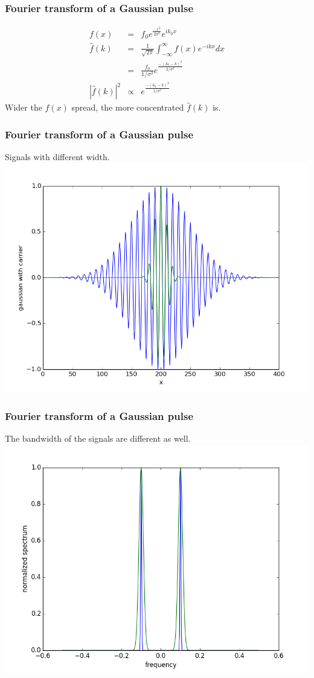 \documentclass{beamer}
\begin{document}
\begin{frame}
\frametitle{Fourier transform of a Gaussian pulse}
\begin{eqnarray}
f(x)&=&f_0e^{\frac{-x^2}{2\sigma^2}}e^{ik_0x} \nonumber \\
\hat{f}(k)&=&\frac{1}{\sqrt{2\pi}}\int_{-\infty}^{\infty}f(x)e^{-ikx}dx \nonumber \\
&=&\frac{f_0}{1/\sigma^2} e^{\frac{-(k_0-k)^2}{2/\sigma^2}}\nonumber \\
|\hat{f}(k)|^2&\varpropto&e^{\frac{-(k_0-k)^2}{1/\sigma^2}}\nonumber 
\end{eqnarray}
Wider the $f(x)$ spread, the more concentrated $\hat{f}(k)$ is.
\end{frame}
\begin{frame}
\frametitle{Fourier transform of a Gaussian pulse}
Signals with different width.
\includegraphics[scale=0.45]{gaussian_carrier.png}
\end{frame}
\begin{frame}
\frametitle{Fourier transform of a Gaussian pulse}
The bandwidth of the signals are different as well.
\includegraphics[scale=0.45]{gaussian_carrier_dft.png}
\end{frame}
\end{document}
